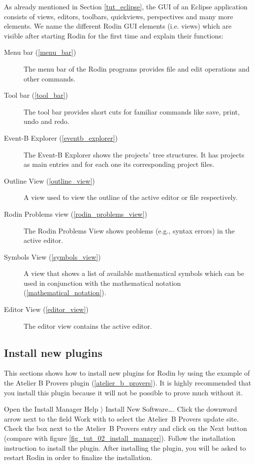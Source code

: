 As already mentioned in Section \ref{tut_eclipse}, the GUI of an Eclipse application consists of views, editors, toolbars, quickviews, perspectives and many more elements. We name the different Rodin GUI elements (i.e. views) which are visible after starting Rodin for the first time and explain their functions:

\begin{description}
	\item[Menu bar (\ref{menu_bar})] The menu bar of the Rodin programs provides file and edit operations and other commands.
	\item[Tool bar (\ref{tool_bar})] The tool bar provides short cuts for familiar commands like save, print, undo and redo.
	\item[Event-B Explorer (\ref{eventb_explorer})] The Event-B Explorer shows the projects' tree structures. It has projects as main entries and for each one its corresponding project files.
	\item[Outline View (\ref{outline_view})] A view used to view the outline of the active editor or file respectively.
	\item[Rodin Problems view (\ref{rodin_problems_view})] The Rodin Problems View shows problems (e.g., syntax errors) in the active editor.
	\item[Symbols View (\ref{symbols_view})] A view that shows a list of available mathematical symbols which can be used in conjunction with the mathematical notation (\ref{mathematical_notation}).
	\item[Editor View (\ref{editor_view})] The editor view contains the active editor.
\end{description}

\subsection{Install new plugins}
\label{tut_install_plugins}

This sections shows how to install new plugins for Rodin by using the example of the Atelier B Provers plugin (\ref{atelier_b_provers}). It is highly recommended that you install this plugin because it will not be possible to prove much without it.

Open the Install Manager \textsf{Help $\rangle$ Install New Software\ldots}. Click the downward arrow next to the field \textsf{Work with} to select the Atelier~B Provers update site. Check the box next to the Atelier~B Provers entry and click on the \textsf{Next} button (compare with figure \ref{fig_tut_02_install_manager}). Follow the installation instruction to install the plugin. After installing the plugin, you will be asked to restart Rodin in order to finalize the installation.

